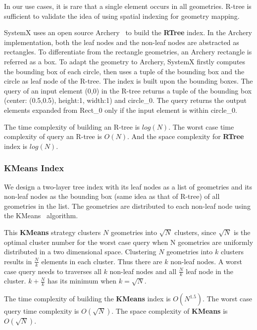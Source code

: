 \documentclass{sig-alternate}
\begin{document}
In our use cases, it is rare that a single element occurs in all geometries.  
R-tree is sufficient to validate the idea of using spatial indexing for geometry mapping.

SystemX uses an open source Archery~\cite{osheim13} to build the {\bf RTree} index.
In the Archery implementation, both the leaf nodes and the non-leaf nodes are abstracted as rectangles.
To differentiate from the rectangle geometries, an Archery rectangle is referred as a box.
To adapt the geometry to Archery, SystemX firstly computes the bounding box of each circle, then uses
a tuple of the bounding box and the circle as leaf node of the R-tree. 
The index is built upon the bounding boxes. 
The query of an input element (0,0) in the R-tree returns a tuple of the bounding box (center: (0.5,0.5), height:1, width:1) and circle\_0.
The query returns the output elements expanded from Rect\_0 only if the input element is within circle\_0.

The time complexity of building an R-tree is $log(N)$.
The worst case time complexity of query an R-tree is $O(N)$.
And the space complexity for {\bf RTree} index is $log(N)$.

\subsubsection{KMeans Index}
We design a two-layer tree index with its leaf nodes as a list of geometries and its non-leaf nodes as the bounding box (same idea as that of R-tree)
of all geometries in the list.
The geometries are distributed to each non-leaf node using the KMeans~\cite{macqueen67} algorithm.

This {\bf KMeans} strategy clusters $N$ geometries into $\sqrt{N}$ clusters, 
since $\sqrt{N}$ is the optimal cluster number for the worst case query when N geometries are uniformly distributed in a two dimensional space.
Clustering $N$ geometries into $k$ clusters results in $\frac{N}{k}$ elements in each cluster. 
Thus there are $k$ non-leaf nodes.
A worst case query needs to traverses all $k$ non-leaf nodes and all $\frac{N}{k}$ leaf node in the cluster.
$k+\frac{N}{k}$ has its minimum when $k=\sqrt{N}$. 

The time complexity of building the {\bf KMeans} index is $O(N^{1.5})$.
The worst case query time complexity is $O(\sqrt{N})$.
The space complexity of {\bf KMeans} is $O(\sqrt{N})$.
\end{document}
